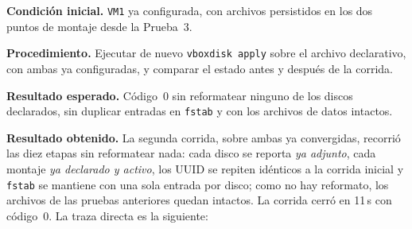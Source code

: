 \textbf{Condición inicial.} \texttt{VM1} ya configurada, con archivos persistidos en los dos puntos de montaje desde la Prueba~3.

\textbf{Procedimiento.} Ejecutar de nuevo \texttt{vboxdisk apply} sobre el archivo declarativo, con ambas \vm{} ya configuradas, y comparar el estado antes y después de la corrida.

\textbf{Resultado esperado.} Código~0 sin reformatear ninguno de los discos declarados, sin duplicar entradas en \texttt{fstab} y con los archivos de datos intactos.

\textbf{Resultado obtenido.} La segunda corrida, sobre ambas \vm{} ya convergidas, recorrió las diez etapas sin reformatear nada: cada disco se reporta \emph{ya adjunto}, cada montaje \emph{ya declarado y activo}, los UUID se repiten idénticos a la corrida inicial y \texttt{fstab} se mantiene con una sola entrada por disco; como no hay reformato, los archivos de las pruebas anteriores quedan intactos. La corrida cerró en 11\,s con código~0. La traza directa es la siguiente:

